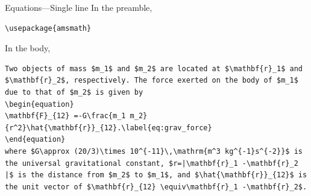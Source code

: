 \documentclass[12pt]{gshs_lecture}
\begin{document}
\begin{frame}[t,fragile]{Equations---Single line}\small
In the preamble,
\begin{block}{}
\begin{lstlisting}
\usepackage{amsmath}
\end{lstlisting}
\end{block}
In the body,
\begin{block}{}
\begin{lstlisting}
Two objects of mass $m_1$ and $m_2$ are located at $\mathbf{r}_1$ and $\mathbf{r}_2$, respectively. The force exerted on the body of $m_1$ due to that of $m_2$ is given by
\begin{equation}
\mathbf{F}_{12} =-G\frac{m_1 m_2}{r^2}\hat{\mathbf{r}}_{12}.\label{eq:grav_force}
\end{equation}
where $G\approx (20/3)\times 10^{-11}\,\mathrm{m^3 kg^{-1}s^{-2}}$ is the universal gravitational constant, $r=|\mathbf{r}_1 -\mathbf{r}_2 |$ is the distance from $m_2$ to $m_1$, and $\hat{\mathbf{r}}_{12}$ is the unit vector of $\mathbf{r}_{12} \equiv\mathbf{r}_1 -\mathbf{r}_2$.
\end{lstlisting}
\end{block}
\end{frame}
\end{document}
